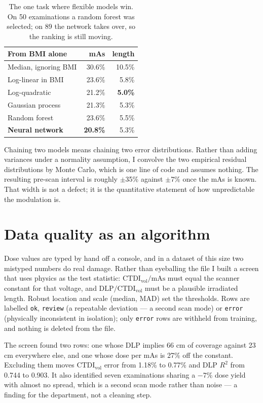 \documentclass[10pt,a4paper,twocolumn]{article}
\newcommand{\ctdi}{\ensuremath{\mathrm{CTDI}_{\mathrm{vol}}}}
\newcommand{\hdr}{\rowcolor{ctsurf}}
\begin{document}
\begin{table}[h]\footnotesize
\begin{tabularx}{\columnwidth}{@{}L r r@{}}
\toprule
\hdr \textbf{From BMI alone} & \textbf{mAs} & \textbf{length}\\
\midrule
Median, ignoring BMI & 30.6\% & 10.5\%\\
Log-linear in BMI & 23.6\% & 5.8\%\\
Log-quadratic & 21.2\% & \textbf{5.0\%}\\
Gaussian process & 21.3\% & 5.3\%\\
Random forest & 23.6\% & 5.5\%\\
\textbf{Neural network} & \textbf{20.8\%} & 5.3\%\\
\bottomrule
\end{tabularx}
\caption{The one task where flexible models win. On 50 examinations a random forest was selected; on 89 the
network takes over, so the ranking is still moving.}
\end{table}

Chaining two models means chaining two error distributions. Rather than adding variances under a normality
assumption, I convolve the two empirical residual distributions by Monte Carlo, which is one line of code and
assumes nothing. The resulting pre-scan interval is roughly $\pm$35\% against $\pm$7\% once the mAs is known.
That width is not a defect; it is the quantitative statement of how unpredictable the modulation is.

\section{Data quality as an algorithm}
\label{sec:quality}

Dose values are typed by hand off a console, and in a dataset of this size two mistyped numbers do real damage.
Rather than eyeballing the file I built a screen that uses physics as the test statistic:
$\ctdi/\mathrm{mAs}$ must equal the scanner constant for that voltage, and $\mathrm{DLP}/\ctdi$ must be a
plausible irradiated length. Robust location and scale (median, MAD) set the thresholds. Rows are labelled
\texttt{ok}, \texttt{review} (a repeatable deviation — a second scan mode) or \texttt{error} (physically
inconsistent in isolation); only \texttt{error} rows are withheld from training, and nothing is deleted from
the file.

The screen found two rows: one whose DLP implies 66 cm of coverage against 23 cm everywhere else, and one whose
dose per mAs is 27\% off the constant. Excluding them moves \ctdi{} error from 1.18\% to 0.77\% and DLP $R^2$
from 0.744 to 0.903. It also identified seven examinations sharing a $-7\%$ dose yield with almost no spread,
which is a second scan mode rather than noise — a finding for the department, not a cleaning step.
\end{document}
